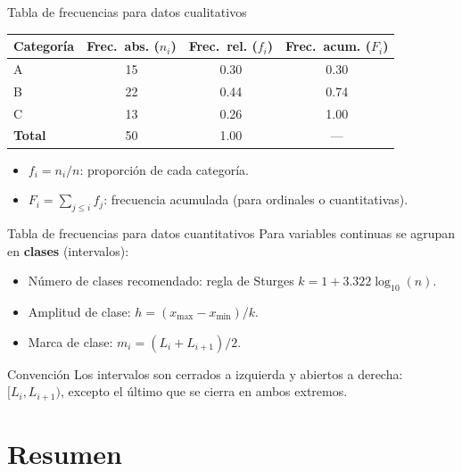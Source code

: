 \documentclass[aspectratio=169]{beamer}
\begin{document}
\begin{frame}{Tabla de frecuencias para datos cualitativos}
  \begin{center}
    \begin{tabular}{lccc}
      \toprule
      \textbf{Categoría} & \textbf{Frec.\ abs.} ($n_i$) & \textbf{Frec.\ rel.} ($f_i$) & \textbf{Frec.\ acum.} ($F_i$) \\
      \midrule
      A & 15 & 0.30 & 0.30 \\
      B & 22 & 0.44 & 0.74 \\
      C & 13 & 0.26 & 1.00 \\
      \midrule
      \textbf{Total} & 50 & 1.00 & --- \\
      \bottomrule
    \end{tabular}
  \end{center}
  \bigskip
  \begin{itemize}
    \item $f_i = n_i / n$: proporción de cada categoría.
    \item $F_i = \sum_{j \le i} f_j$: frecuencia acumulada (para ordinales o cuantitativas).
  \end{itemize}
\end{frame}

\begin{frame}{Tabla de frecuencias para datos cuantitativos}
  Para variables continuas se agrupan en \textbf{clases} (intervalos):
  \begin{itemize}
    \item Número de clases recomendado: regla de Sturges $k = 1 + 3.322 \log_{10}(n)$.
    \item Amplitud de clase: $h = (x_{\max} - x_{\min})/k$.
    \item Marca de clase: $m_i = (L_i + L_{i+1})/2$.
  \end{itemize}
  \bigskip
  \begin{alertblock}{Convención}
    Los intervalos son cerrados a izquierda y abiertos a derecha: $[L_i, L_{i+1})$, excepto el último que se cierra en ambos extremos.
  \end{alertblock}
\end{frame}

\section{Resumen}
\end{document}
